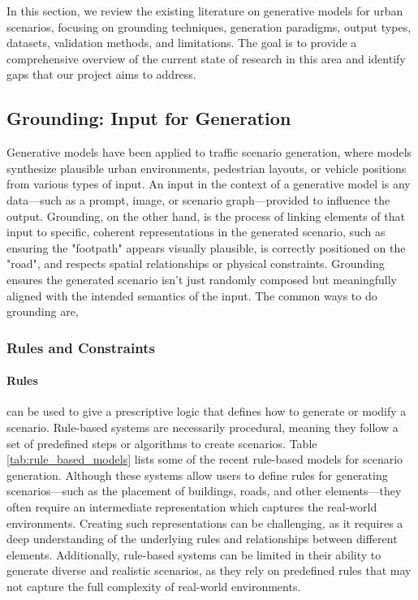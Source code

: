 \documentclass{article}
\begin{document}
In this section, we review the existing literature on generative models for urban scenarios, focusing on grounding techniques, generation paradigms, output types, datasets, validation methods, and limitations. The goal is to provide a comprehensive overview of the current state of research in this area and identify gaps that our project aims to address. 

\subsection{Grounding: Input for Generation}

Generative models have been applied to traffic scenario generation, where models synthesize plausible urban environments, pedestrian layouts, or vehicle positions from various types of input. An input in the context of a generative model is any data—such as a prompt, image, or scenario graph—provided to influence the output. Grounding, on the other hand, is the process of linking elements of that input to specific, coherent representations in the generated scenario, such as ensuring the "footpath" appears visually plausible, is correctly positioned on the "road", and respects spatial relationships or physical constraints. Grounding ensures the generated scenario isn't just randomly composed but meaningfully aligned with the intended semantics of the input. The common ways to do grounding are,

\subsubsection{Rules and Constraints}

\paragraph{Rules} can be used to give a prescriptive logic that defines how to generate or modify a scenario. Rule-based systems are necessarily procedural, meaning they follow a set of predefined steps or algorithms to create scenarios. Table \ref{tab:rule_based_models} lists some of the recent rule-based models for scenario generation. Although these systems allow users to define rules for generating scenarios—such as the placement of buildings, roads, and other elements—they often require an intermediate representation which captures the real-world environments. Creating such representations can be challenging, as it requires a deep understanding of the underlying rules and relationships between different elements. Additionally, rule-based systems can be limited in their ability to generate diverse and realistic scenarios, as they rely on predefined rules that may not capture the full complexity of real-world environments.
\end{document}
